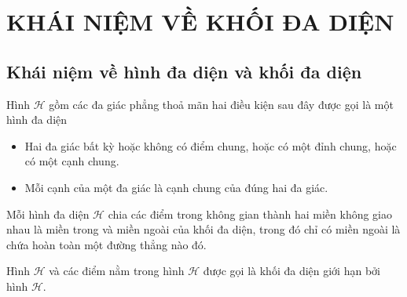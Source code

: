 \section{KHÁI NIỆM VỀ KHỐI ĐA DIỆN}
\subsection{Khái niệm về hình đa diện và khối đa diện}
	\begin{dn}%
		Hình $\mathscr H$ gồm các đa giác phẳng thoả mãn hai điều kiện sau đây được gọi là một hình đa diện\begin{itemize}
			\item Hai đa giác bất kỳ hoặc không có điểm chung, hoặc có một đỉnh chung, hoặc có một cạnh chung.
			\item Mỗi cạnh của  một đa giác là cạnh chung của đúng hai đa giác.
		\end{itemize}
	\end{dn}
	\begin{note}%
		Mỗi hình đa diện $\mathscr H$ chia các điểm trong không gian thành hai miền không giao nhau là miền trong và miền ngoài của khối đa diện, trong đó chỉ có miền ngoài là chứa hoàn toàn một đường thẳng nào đó.
	\end{note}
\begin{dn}%
	Hình $\mathscr H$ và các điểm nằm trong hình $\mathscr H$ được gọi là khối đa diện giới hạn bởi hình $\mathscr H.$    
\end{dn}
	
